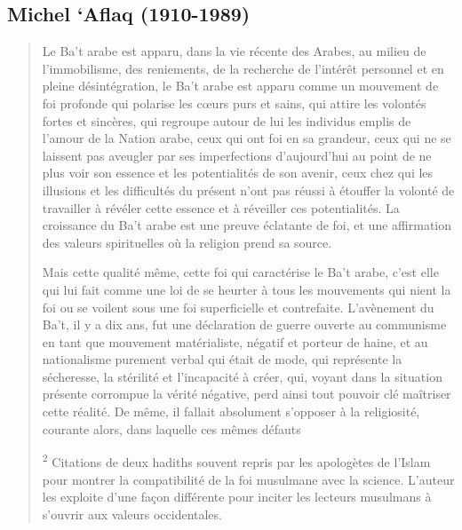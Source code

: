 \hypertarget{michel-aflaq-1910-1989}{%
\subsection{\texorpdfstring{{Michel `Aflaq
(1910-1989)}}{Michel `Aflaq (1910-1989)}}\label{michel-aflaq-1910-1989}}

\begin{quote}
Le Ba't arabe est apparu, dans la vie récente des Arabes, au milieu de
l'immobilisme, des reniements, de la recherche de l'intérêt personnel et
en pleine désintégration, le Ba't arabe est apparu comme un mouvement de
foi profonde qui polarise les cœurs purs et sains, qui attire les
volontés fortes et sincères, qui regroupe autour de lui les individus
emplis de l'amour de la Nation arabe, ceux qui ont foi en sa grandeur,
ceux qui ne se laissent pas aveugler par ses imperfections d'aujourd'hui
au point de ne plus voir son essence et les potentialités de son avenir,
ceux chez qui les illusions et les difficultés du présent n'ont pas
réussi à étouffer la volonté de travailler à révéler cette essence et à
réveiller ces potentialités. La croissance du Ba't arabe est une preuve
éclatante de foi, et une affirmation des valeurs spirituelles où la
religion prend sa source.

Mais cette qualité même, cette foi qui caractérise le Ba't arabe, c'est
elle qui lui fait comme une loi de se heurter à tous les mouvements qui
nient la foi ou se voilent sous une foi superficielle et contrefaite.
L'avènement du Ba't, il y a dix ans, fut une déclaration de guerre
ouverte au communisme en tant que mouvement matérialiste, négatif et
porteur de haine, et au nationalisme purement verbal qui était de mode,
qui représente la sécheresse, la stérilité et l'incapacité à créer, qui,
voyant dans la situation présente corrompue la vérité négative, perd
ainsi tout pouvoir clé maîtriser cette réalité. De même, il fallait
absolument s'opposer à la religiosité, courante alors, dans laquelle ces
mêmes défauts

\textsuperscript{2} Citations de deux hadiths souvent repris par les
apologètes de l'Islam pour montrer la compatibilité de la foi musulmane
avec la science. L'auteur les exploite d'une façon différente pour
inciter les lecteurs musulmans à s'ouvrir aux valeurs occidentales.


\end{quote}
